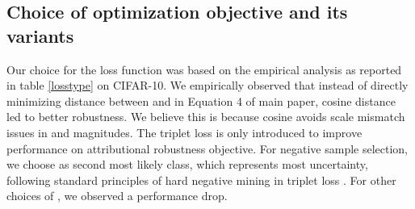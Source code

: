 \documentclass[runningheads]{llncs}
\begin{document}
\subsection{Choice of optimization objective  and its variants}\label{choice_of_loss}

Our choice for the loss function was based on the empirical analysis as reported in table \ref{losstype} on CIFAR-10. We empirically observed that instead of directly minimizing  distance between  and  in Equation 4 of main paper, cosine distance led to better robustness. We believe this is because cosine avoids scale mismatch issues in  and  magnitudes. The triplet loss is only introduced to improve performance on attributional robustness objective. For negative sample selection, we choose  as second most likely class, which represents most uncertainty, following standard principles of hard negative mining in triplet loss \cite{triplet,triplet1}. For other choices of  , we observed a performance drop.
\end{document}
